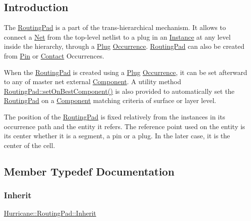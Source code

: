 \hypertarget{classHurricane_1_1RoutingPad_secRoutingPadIntro}{}\subsection{Introduction}\label{classHurricane_1_1RoutingPad_secRoutingPadIntro}
The \hyperlink{classHurricane_1_1RoutingPad}{Routing\+Pad} is a part of the trans-\/hierarchical mechanism. It allows to connect a \hyperlink{classHurricane_1_1Net}{Net} from the top-\/level netlist to a plug in an \hyperlink{classHurricane_1_1Instance}{Instance} at any level inside the hierarchy, through a \hyperlink{classHurricane_1_1Plug}{Plug} \hyperlink{classHurricane_1_1Occurrence}{Occurrence}. \hyperlink{classHurricane_1_1RoutingPad}{Routing\+Pad} can also be created from \hyperlink{classHurricane_1_1Pin}{Pin} or \hyperlink{classHurricane_1_1Contact}{Contact} Occurrences.

When the \hyperlink{classHurricane_1_1RoutingPad}{Routing\+Pad} is created using a \hyperlink{classHurricane_1_1Plug}{Plug} \hyperlink{classHurricane_1_1Occurrence}{Occurrence}, it can be set afterward to any of master net external \hyperlink{classHurricane_1_1Component}{Component}. A utility method \hyperlink{classHurricane_1_1RoutingPad_a410992ef75c40f9a898c36f39a7d1a1a}{Routing\+Pad\+::set\+On\+Best\+Component()} is also provided to automatically set the \hyperlink{classHurricane_1_1RoutingPad}{Routing\+Pad} on a \hyperlink{classHurricane_1_1Component}{Component} matching criteria of surface or layer level.

The position of the \hyperlink{classHurricane_1_1RoutingPad}{Routing\+Pad} is fixed relatively from the instances in it\textquotesingle{}s occurrence path and the entity it refers. The reference point used on the entity is it\textquotesingle{}s center whether it is a segment, a pin or a plug. In the later case, it is the center of the cell. 

\subsection{Member Typedef Documentation}
\mbox{\label{classHurricane_1_1RoutingPad_a53bed3713fe846a351621d2022bc6b68}} 
\subsubsection{\texorpdfstring{Inherit}{Inherit}}
{\footnotesize\ttfamily \hyperlink{classHurricane_1_1RoutingPad_a53bed3713fe846a351621d2022bc6b68}{Hurricane\+::\+Routing\+Pad\+::\+Inherit}}


